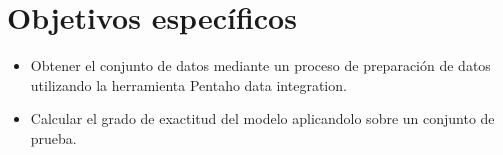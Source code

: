 \section{Objetivos espec\'ificos}
\begin{itemize}
    \item Obtener el conjunto de datos mediante un proceso de preparaci\'on de datos utilizando la herramienta
    Pentaho data integration.
    \item Calcular el grado de exactitud del modelo aplicandolo sobre un conjunto de prueba.
\end{itemize}

